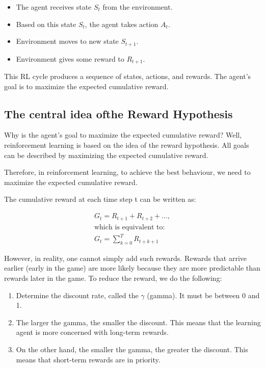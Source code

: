 \documentclass{article}
\numberwithin{equation}{subsection}
\begin{document}
\begin{itemize}
	\item The agent receives state $S_t$ from the environment. 
	\item Based on this state $S_t$, the agent takes action $A_t$.
	\item Environment moves to new state $S_{t+1}$.
	\item Environment gives some reward to $R_{t+1}$.
\end{itemize}


This RL cycle produces a sequence of states, actions, and rewards.
The agent's goal is to maximize the expected cumulative reward.

\subsection{The central idea of ​​the Reward Hypothesis}\textbf{}

Why is the agent's goal to maximize the expected cumulative reward? Well, reinforcement learning is based on the idea of ​​the reward hypothesis. All goals can be described by maximizing the expected cumulative reward.

Therefore, in reinforcement learning, to achieve the best behaviour, we need to maximize the expected cumulative reward.

The cumulative reward at each time step t can be written as:

\begin{equation}
	\begin{gathered}
	G_t=R_{t+1}+R_{t+2}+\ldots, \\
	\text{which is equivalent to:}\\
	G_t=\sum_{k=0}^T R_{t+k+1}
	\end{gathered}
\end{equation}


However, in reality, one cannot simply add such rewards. Rewards that arrive earlier (early in the game) are more likely because they are more predictable than rewards later in the game. To reduce the reward, we do the following:
\begin{enumerate}
	\item Determine the discount rate, called the $\gamma$ (gamma). It must be between 0 and 1.
	\item The larger the gamma, the smaller the discount. This means that the learning agent is more concerned with long-term rewards.
	\item On the other hand, the smaller the gamma, the greater the discount. This means that short-term rewards are in priority.
\end{enumerate}
\end{document}
